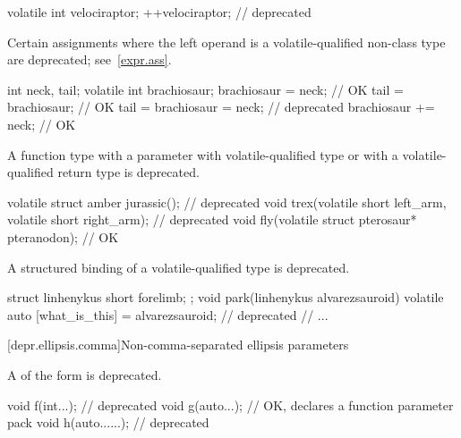 \begin{example}
\begin{codeblock}
volatile int velociraptor;
++velociraptor;                     // deprecated
\end{codeblock}
\end{example}


\pnum
Certain assignments
where the left operand is a volatile-qualified non-class type
are deprecated; see~\ref{expr.ass}.

\begin{example}
\begin{codeblock}
int neck, tail;
volatile int brachiosaur;
brachiosaur = neck;                 // OK
tail = brachiosaur;                 // OK
tail = brachiosaur = neck;          // deprecated
brachiosaur += neck;                // OK
\end{codeblock}
\end{example}


\pnum
A function type
with a parameter with volatile-qualified type or
with a volatile-qualified return type is deprecated.

\begin{example}
\begin{codeblock}
volatile struct amber jurassic();                               // deprecated
void trex(volatile short left_arm, volatile short right_arm);   // deprecated
void fly(volatile struct pterosaur* pteranodon);                // OK
\end{codeblock}
\end{example}


\pnum
A structured binding of a volatile-qualified type
is deprecated.

\begin{example}
\begin{codeblock}
struct linhenykus { short forelimb; };
void park(linhenykus alvarezsauroid) {
  volatile auto [what_is_this] = alvarezsauroid;                // deprecated
  // ...
}
\end{codeblock}
\end{example}

[depr.ellipsis.comma]{Non-comma-separated ellipsis parameters}

A 
of the form
 
is deprecated.
\begin{example}
\begin{codeblock}
void f(int...);         // deprecated
void g(auto...);        // OK, declares a function parameter pack
void h(auto......);     // deprecated
\end{codeblock}
\end{example}

